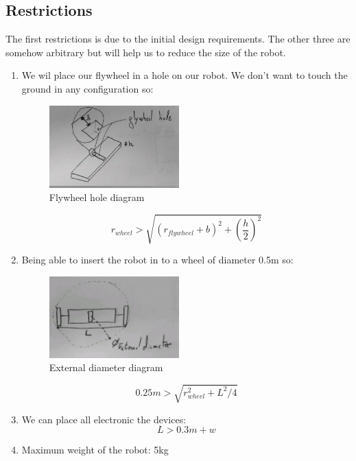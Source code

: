 \subsection{Restrictions}
The first restrictions is due to the initial design requirements. The other three are 
somehow arbitrary but will help us to reduce the size of the robot.
\begin{enumerate}
\item We wil place our flywheel in a hole on our robot. We don't want to touch the ground
in any configuration so:
\begin{figure}[ht]
	\centering
	\includegraphics[width=5cm]{img/flywheel_hole.jpg}
	\caption{Flywheel hole diagram}
	\label{fig:Flywheel hole diagram}
\end{figure}
\[r_{wheel}> \sqrt{(r_{flywheel} + b)^2+(\frac{h}{2})^2}\]
\item Being able  to insert the robot in to a wheel of diameter 0.5m so:
\begin{figure}[ht]
	\centering
	\includegraphics[width=5cm]{img/external_diameter.jpg}
	\caption{External diameter diagram}
	\label{fig:External diameter diagram}
\end{figure}
\[0.25 m > \sqrt{r_{wheel}^2 + L^2/4}\]
\item We can place all electronic the devices:
\[L > 0.3m + w \]
\item Maximum weight of the robot: 5kg
\end{enumerate}

